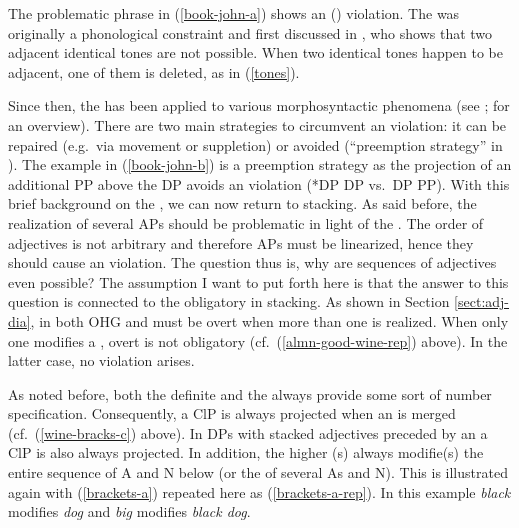 \documentclass[output=paper,colorlinks,citecolor=brown]{langscibook}
\begin{document}
The problematic phrase in (\ref{book-john-a}) shows an  () violation. The  was originally a phonological constraint and first discussed in \citet{leben1973suprasegmental}, who shows that two adjacent identical tones are not possible. When two identical tones happen to be adjacent, one of them is deleted, as in (\ref{tones}).

\ea\label{tones}
\z
\z

Since then, the  has been applied to various morphosyntactic phenomena (see \citealp{neeleman2017syntactic}; \citealp{nevins2012haplological} for an overview). There are two main strategies to circumvent an  violation: it can be repaired (e.g.~via movement or suppletion) or avoided (``preemption strategy'' in \citealp{nevins2012haplological}). The example in (\ref{book-john-b}) is a preemption strategy as the projection of an additional PP above the DP avoids an  violation (*DP DP vs.~DP PP). With this brief background on the , we can now return to  stacking. As said before, the realization of several APs should be problematic in light of the . The order of adjectives is not arbitrary and therefore APs must be linearized, hence they should cause an  violation. The question thus is, why are sequences of adjectives even possible? The assumption I want to put forth here is that the answer to this question is connected to the obligatory  in stacking. As shown in Section \ref{sect:adj-dia}, in both OHG and   must be overt when more than one  is realized. When only one  modifies a , overt  is not obligatory (cf.~(\ref{almn-good-wine-rep}) above). In the latter case, no  violation arises.

As noted before, both the definite and the   always provide some sort of number specification. Consequently, a ClP is always projected when an  is merged (cf.~(\ref{wine-bracks-c}) above). In DPs with stacked adjectives preceded by an  a ClP is also always projected. In addition, the higher (s) always modifie(s) the entire sequence of A and N below (or the  of several As and N). This is illustrated again with (\ref{brackets-a}) repeated here as (\ref{brackets-a-rep}). In this example \textit{black} modifies \textit{dog} and \textit{big} modifies \textit{black dog}.
 
\end{document}
